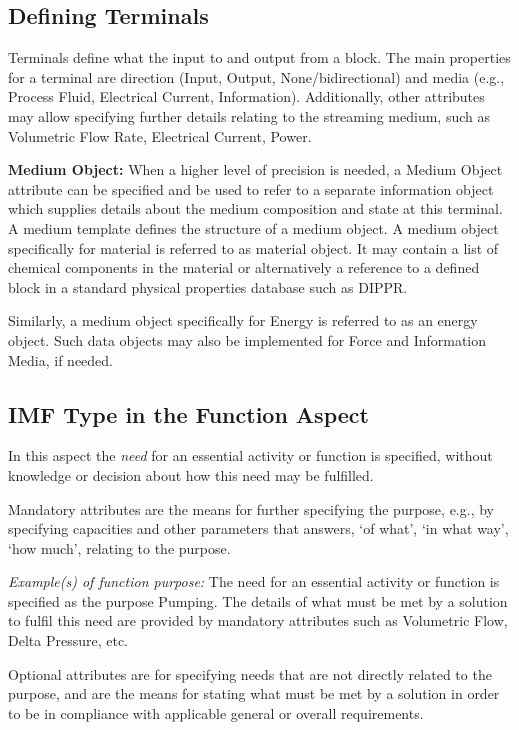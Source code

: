\documentclass[../main.tex]{subfiles}
\begin{document}
\subsection{Defining Terminals}
Terminals define what the input to and output from a block. The main
properties for a terminal are direction (Input, Output, None/bidirectional) and media (e.g., Process Fluid, Electrical
Current, Information). Additionally, other attributes may allow specifying further details relating to the streaming
medium, such as Volumetric Flow Rate, Electrical Current, Power.

\textbf{Medium Object:} When a higher level of precision is needed, a Medium Object attribute can be specified and
be used to refer to a separate information object which supplies details about the medium composition and state at
this terminal. A medium template defines the structure of a medium object. A medium object specifically for material
is referred to as material object. It may contain a list of chemical components in the material or alternatively a
reference to a defined block in a standard physical properties database such as DIPPR.

Similarly, a medium object specifically for Energy is referred to as an energy object. Such data objects may also be
implemented for Force and Information Media, if needed.

\subsection{IMF Type in the Function Aspect}
In this aspect the \emph{need} for an essential activity or function is specified,
without knowledge or decision about how this need may be fulfilled.

Mandatory attributes are the means for further specifying the purpose, e.g., by specifying capacities and other
parameters that answers, `of what', `in what way', `how much', relating to the purpose.

\emph{Example(s) of function purpose:}
The need for an essential activity or function is specified as the purpose Pumping. The details of what must
        be met by a solution to fulfil this need are provided by mandatory attributes such as Volumetric Flow,
        Delta Pressure, etc.

Optional attributes are for specifying needs that are not directly related to the purpose, and are the means for
stating what must be met by a solution in order to be in compliance with applicable general or overall requirements.
\end{document}
